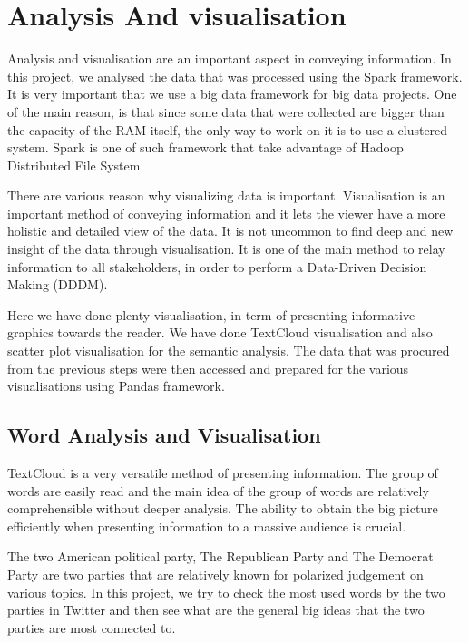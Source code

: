 \section{Analysis And visualisation}

Analysis and visualisation are an important aspect in conveying information. In this project, we analysed the data that was processed using the Spark framework. It is very important that we use a big data framework for big data projects. One of the main reason, is that since some data that were collected are bigger than the capacity of the RAM itself, the only way to work on it is to use a clustered system. Spark is one of such framework that take advantage of Hadoop Distributed File System.

There are various reason why visualizing data is important. Visualisation is an important method of conveying information and it lets the viewer have a more holistic and detailed view of the data. It is not uncommon to find deep and new insight of the data through visualisation. It is one of the main method to relay information to all stakeholders, in order to perform a Data-Driven Decision Making (DDDM).

Here we have done plenty visualisation, in term of presenting informative graphics towards the reader. We have done TextCloud visualisation and also scatter plot visualisation for the semantic analysis. The data that was procured from the previous steps were then accessed and prepared for the various visualisations using Pandas framework.

\subsection{Word Analysis and Visualisation}

TextCloud is a very versatile method of presenting information. The group of words are easily read and the main idea of the group of words are relatively comprehensible without deeper analysis. The ability to obtain the big picture efficiently when presenting information to a massive audience is crucial.

The two American political party, The Republican Party and The Democrat Party are two parties that are relatively known for polarized judgement on various topics. In this project, we try to check the most used words by the two parties in Twitter and then see what are the general big ideas that the two parties are most connected to.


